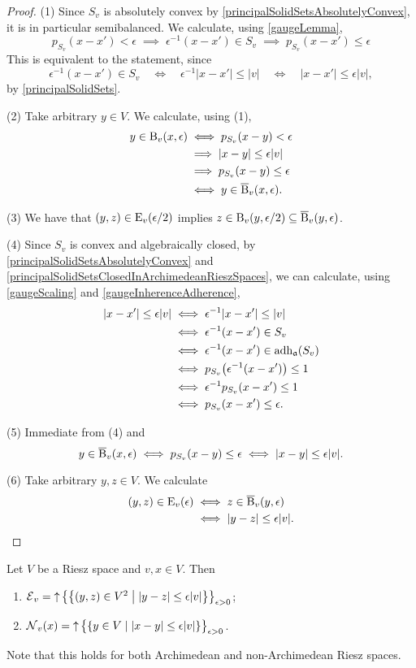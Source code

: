 \begin{proof}
(1) Since $S_v$ is absolutely convex by \ref{principalSolidSetsAbsolutelyConvex}, it is in particular semibalanced.  We calculate, using \ref{gaugeLemma},
\[ p_{S_v}(x-x') < \epsilon \;\implies\; \epsilon^{-1}(x-x') \in S_v \;\implies\; p_{S_v}(x-x') \leq \epsilon \]
This is equivalent to the statement, since
\[ \epsilon^{-1}(x-x') \in S_v \quad\iff\quad \epsilon^{-1}|x-x'| \leq |v| \quad\iff\quad |x-x'| \leq \epsilon |v|, \]
by \ref{principalSolidSets}.

(2) Take arbitrary $y\in V$. We calculate, using (1),
\begin{align*}
y \in \operatorname{B}_v(x, \epsilon) &\iff p_{S_v}(x-y) < \epsilon \\
&\implies |x-y| \leq \epsilon |v| \\
&\implies p_{S_v}(x-y) \leq \epsilon \\
&\iff y \in \operatorname{\overline{B}}_v(x, \epsilon).
\end{align*}

(3) We have that $(y,z) \in \operatorname{E}_v(\epsilon/2)$ implies $z\in \operatorname{B}_v(y,\epsilon /2) \subseteq \operatorname{\overline{B}}_v(y,\epsilon)$.

(4) Since $S_v$ is convex and algebraically closed, by \ref{principalSolidSetsAbsolutelyConvex} and \ref{principalSolidSetsClosedInArchimedeanRieszSpaces}, we can calculate, using \ref{gaugeScaling} and \ref{gaugeInherenceAdherence},
\begin{align*}
|x-x'| \leq \epsilon|v| &\iff \epsilon^{-1}|x-x'| \leq |v| \\
&\iff \epsilon^{-1}(x-x') \in S_v \\
&\iff \epsilon^{-1}(x-x') \in \operatorname{adh}_{\mathfrak{a}}(S_v) \\
&\iff p_{S_v}\big(\epsilon^{-1}(x-x')\big) \leq 1 \\
&\iff \epsilon^{-1}p_{S_v}(x-x') \leq 1 \\
&\iff p_{S_v}(x-x') \leq \epsilon.
\end{align*}

(5) Immediate from (4) and
\[ y \in \operatorname{\overline{B}}_v(x, \epsilon) \iff p_{S_v}(x-y) \leq \epsilon \iff |x-y| \leq \epsilon|v|. \] 

(6) Take arbitrary $y,z \in V$. We calculate
\begin{align*}
(y,z) \in \operatorname{E}_v(\epsilon) &\iff z\in \operatorname{\overline{B}}_v(y,\epsilon) \\
&\iff |y-z| \leq \epsilon |v|.
\end{align*}
\end{proof}
\begin{corollary} \label{vEntouragesBase}
Let $V$ be a Riesz space and $v,x\in V$. Then
\begin{enumerate}
\item $\entourages_v = \upset \big\{\setbuilder{(y,z)\in V^2}{|y-z| \leq \epsilon |v|}\big\}_{\epsilon > 0}$;
\item $\neighbourhoods_v(x) = \upset \big\{\setbuilder{y\in V}{|x-y| \leq \epsilon|v|}\big\}_{\epsilon > 0}$.
\end{enumerate}
\end{corollary}
Note that this holds for both Archimedean and non-Archimedean Riesz spaces.

